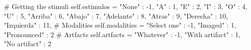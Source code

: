 # Getting the stimuli
self.estimulos = {
	"None" : -1, "A" : 1, "E" : 2, "I" : 3,
	"O" : 4, "U" : 5, "Arriba" : 6, 
	"Abajo" : 7, "Adelante" : 8, "Atras" : 9,
	"Derecha" : 10, "Izquierda" : 11,
}
# Modalities
self.modalities = {
	"Select one" : -1,
	"Imaged" : 1,
	"Pronounced" : 2
}
# Artfacts
self.artfacts = {
	"Whatever" : -1,
	"With artifact" : 1,
	"No artifact" : 2
}